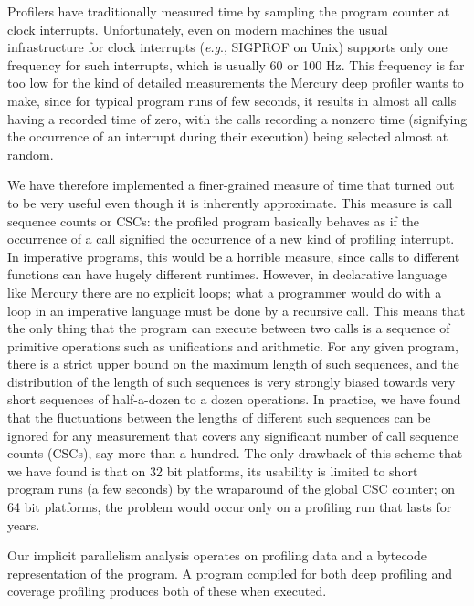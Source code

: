 Profilers have traditionally measured time
by sampling the program counter at clock interrupts.
Unfortunately, even on modern machines
the usual infrastructure for clock interrupts (\emph{e.g}., SIGPROF on Unix)
supports only one frequency for such interrupts,
which is usually 60 or 100 Hz.
This frequency is far too low for the kind of detailed measurements
the Mercury deep profiler wants to make,
since for typical program runs of few seconds,
it results in almost all calls having a recorded time of zero,
with the calls recording a nonzero time
(signifying the occurrence of an interrupt during their execution)
being selected almost at random.

We have therefore implemented a finer-grained measure of time
that turned out to be very useful
even though it is inherently approximate.
This measure is call sequence counts or CSCs:
the profiled program basically behaves
as if the occurrence of a call signified
the occurrence of a new kind of profiling interrupt.
In imperative programs, this would be a horrible measure,
since calls to different functions can have hugely different runtimes.
However, in declarative language like Mercury there are no explicit loops;
what a programmer would do with a loop in an imperative language
must be done by a recursive call.
This means that the only thing that the program can execute between two calls
is a sequence of primitive operations such as unifications and arithmetic.
For any given program,
there is a strict upper bound on the maximum length of such sequences,
and the distribution of the length of such sequences
is very strongly biased towards very short sequences
of half-a-dozen to a dozen operations.
In practice, we have found that
the fluctuations between the lengths of different such sequences
can be ignored for any measurement
that covers any significant number of call sequence counts (CSCs),
say more than a hundred.
The only drawback of this scheme that we have found
is that on 32 bit platforms,
its usability is limited to short program runs (a few seconds)
by the wraparound of the global CSC counter;
on 64 bit platforms, the problem would occur
only on a profiling run that lasts for years.



Our implicit parallelism analysis operates on profiling data and a
bytecode representation of the program.
A program compiled for both deep profiling and coverage profiling
produces both of these when executed.

